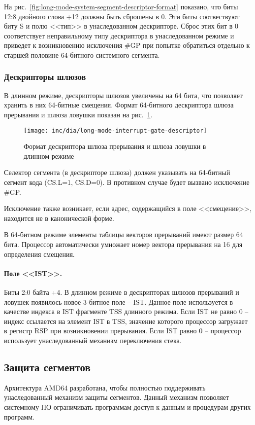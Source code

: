 На рис.~\ref{fig:long-mode-system-segment-descriptor-format} показано, что биты 12:8 двойного слова +12
должны быть сброшены в 0. Эти биты соотвествуют биту S и полю <<тип>> в унаследованном дескрипторе.
Сброс этих бит в 0 соответствует неправильному типу дескриптора в унаследованном режиме и приведет
к возникновению исключения \#GP при попытке обратиться отдельно к старшей половине 64-битного системного сегмента.

\subsubsection*{Дескрипторы шлюзов}
В длинном режиме, дескрипторы шлюзов увеличены на 64 бита, что позволяет хранить в них 64-битные смещения.
Формат 64-битного дескриптора шлюза прерывания и шлюза ловушки показан на рис.~\ref{fig:long-mode-interrupt-gate-descriptor}.

\begin{figure}[ht]
  \centering
  \texttt{[image: inc/dia/long-mode-interrupt-gate-descriptor]}
  \caption{Формат дескриптора шлюза прерывания и шлюза ловушки в длинном режиме}
  \label{fig:long-mode-interrupt-gate-descriptor}
\end{figure}

Селектор сегмента (в дескрипторе шлюза) должен указывать на 64-битный сегмент кода (CS.L=1, CS.D=0).
В противном случае будет вызвано исключение \#GP.

Исключение также возникает, если адрес, содержащийся в поле <<смещение>>, находится не в канонической форме.

В 64-битном режиме элементы таблицы векторов прерываний имеют размер 64 бита. Процессор автоматически
умножает номер вектора прерывания на 16 для определения смещения.

\paragraph{Поле <<IST>>.} Биты 2:0 байта +4. В длинном режиме в дескрипторах шлюзов прерываний и ловушек
появилось новое 3-битное поле -- IST. Данное поле используется в качестве индекса в IST фрагменте TSS длинного режима.
Если IST не равно 0 -- индекс ссылается на элемент IST в TSS, значение которого процессор загружает в регистр RSP при
возникновении прерывания. Если IST равно 0 -- процессор использует унаследованный механизм переключения стека.

\subsection{Защита сегментов}
Архитектура AMD64 разработана, чтобы полностью поддерживать унаследованный механизм защиты сегментов.
Данный механизм позволяет системному ПО ограничивать программам доступ к данным и процедурам других программ.

